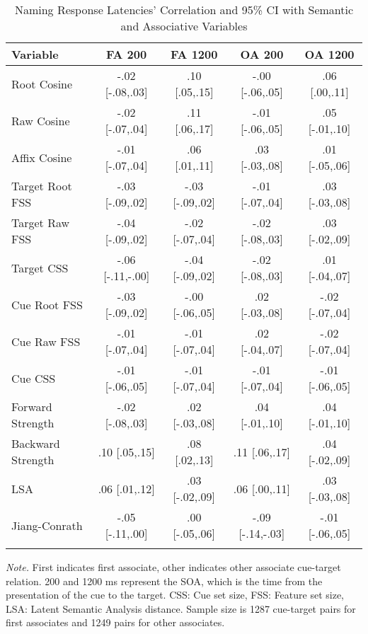 \documentclass[english,,man]{apa6}
\begin{document}
\begin{table}[tbp]
\begin{center}
\begin{threeparttable}
\caption{\label{tab:name-table}Naming Response Latencies' Correlation and 95\% CI with Semantic and Associative Variables}
\small{
\begin{tabular}{lcccc}
\toprule
Variable & \multicolumn{1}{c}{FA 200} & \multicolumn{1}{c}{FA 1200} & \multicolumn{1}{c}{OA 200} & \multicolumn{1}{c}{OA 1200}\\
\midrule
Root Cosine & -.02 [-.08,.03] & .10 [.05,.15] & -.00 [-.06,.05] & .06 [.00,.11]\\
Raw Cosine & -.02 [-.07,.04] & .11 [.06,.17] & -.01 [-.06,.05] & .05 [-.01,.10]\\
Affix Cosine & -.01 [-.07,.04] & .06 [.01,.11] & .03 [-.03,.08] & .01 [-.05,.06]\\
Target Root FSS & -.03 [-.09,.02] & -.03 [-.09,.02] & -.01 [-.07,.04] & .03 [-.03,.08]\\
Target Raw FSS & -.04 [-.09,.02] & -.02 [-.07,.04] & -.02 [-.08,.03] & .03 [-.02,.09]\\
Target CSS & -.06 [-.11,-.00] & -.04 [-.09,.02] & -.02 [-.08,.03] & .01 [-.04,.07]\\
Cue Root FSS & -.03 [-.09,.02] & -.00 [-.06,.05] & .02 [-.03,.08] & -.02 [-.07,.04]\\
Cue Raw FSS & -.01 [-.07,.04] & -.01 [-.07,.04] & .02 [-.04,.07] & -.02 [-.07,.04]\\
Cue CSS & -.01 [-.06,.05] & -.01 [-.07,.04] & -.01 [-.07,.04] & -.01 [-.06,.05]\\
Forward Strength & -.02 [-.08,.03] & .02 [-.03,.08] & .04 [-.01,.10] & .04 [-.01,.10]\\
Backward Strength & .10 [.05,.15] & .08 [.02,.13] & .11 [.06,.17] & .04 [-.02,.09]\\
LSA & .06 [.01,.12] & .03 [-.02,.09] & .06 [.00,.11] & .03 [-.03,.08]\\
Jiang-Conrath & -.05 [-.11,.00] & .00 [-.05,.06] & -.09 [-.14,-.03] & -.01 [-.06,.05]\\
\bottomrule
\addlinespace
\end{tabular}
}
\begin{tablenotes}[para]
\normalsize{\textit{Note.} First indicates first associate, other indicates other associate cue-target relation. 200 and 1200 ms represent the SOA, which is the time from the presentation of the cue to the target. CSS: Cue set size, FSS: Feature set size, LSA: Latent Semantic Analysis distance. Sample size is 1287 cue-target pairs for first associates and 1249 pairs for other associates.}
\end{tablenotes}
\end{threeparttable}
\end{center}
\end{table}
\end{document}

